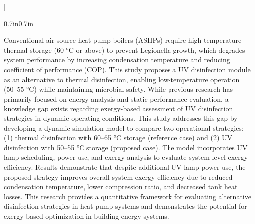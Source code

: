 \documentclass[letterpaper,10pt]{article}
\begin{document}
\twocolumn[
\begin{@twocolumnfalse}

\vspace*{60pt}
\vspace{18pt}


\vspace{6pt}

\vspace{24pt}
\begin{adjustwidth}{0.7in}{0.7in}
{\fontsize{9pt}{9pt}\selectfont\justifying
{} Conventional air-source heat pump boilers (ASHPs) require high-temperature thermal storage (60 °C or above) to prevent Legionella growth, which degrades system performance by increasing condensation temperature and reducing coefficient of performance (COP). This study proposes a UV disinfection module as an alternative to thermal disinfection, enabling low-temperature operation (50--55 °C) while maintaining microbial safety. While previous research has primarily focused on energy analysis and static performance evaluation, a knowledge gap exists regarding exergy-based assessment of UV disinfection strategies in dynamic operating conditions. This study addresses this gap by developing a dynamic simulation model to compare two operational strategies: (1) thermal disinfection with 60--65 °C storage (reference case) and (2) UV disinfection with 50--55 °C storage (proposed case). The model incorporates UV lamp scheduling, power use, and exergy analysis to evaluate system-level exergy efficiency. Results demonstrate that despite additional UV lamp power use, the proposed strategy improves overall system exergy efficiency due to reduced condensation temperature, lower compression ratio, and decreased tank heat losses. This research provides a quantitative framework for evaluating alternative disinfection strategies in heat pump systems and demonstrates the potential for exergy-based optimization in building energy systems.\par}


\end{adjustwidth}
\end{@twocolumnfalse}
\end{document}
